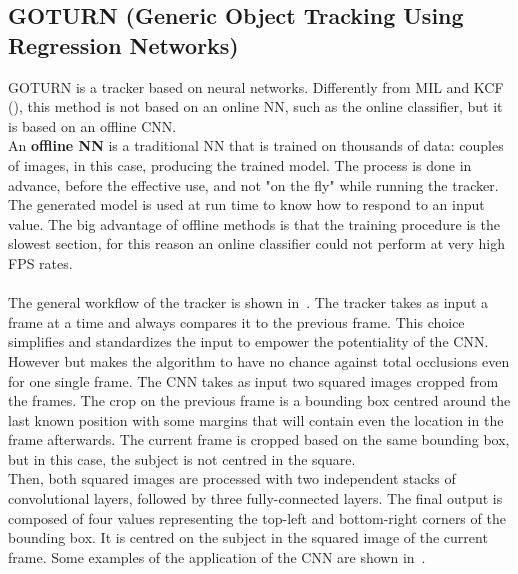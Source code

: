 \subsection{GOTURN (Generic Object Tracking Using Regression Networks)} \label{sec:goturn}
GOTURN\cite{goturn} is a tracker based on neural networks. Differently from MIL and KCF (), this method is not based on an online NN, such as the online classifier, but it is based on an offline CNN.\\
An \textbf{offline NN} is a traditional NN that is trained on thousands of data: couples of images, in this case, producing the trained model. The process is done in advance, before the effective use, and not "on the fly" while running the tracker. The generated model is used at run time to know how to respond to an input value. The big advantage of offline methods is that the training procedure is the slowest section, for this reason an online classifier could not perform at very high FPS rates.\\
\\
The general workflow of the tracker is shown in~. The tracker takes as input a frame at a time and always compares it to the previous frame. This choice simplifies and standardizes the input to empower the potentiality of the CNN. However but makes the algorithm to have no chance against total occlusions even for one single frame. The CNN takes as input two squared images cropped from the frames. The crop on the previous frame is a bounding box centred around the last known position with some margins that will contain even the location in the frame afterwards. The current frame is cropped based on the same bounding box, but in this case, the subject is not centred in the square.\\
Then, both squared images are processed with two independent stacks of convolutional layers, followed by three fully-connected layers. The final output is composed of four values representing the top-left and bottom-right corners of the bounding box. It is centred on the subject in the squared image of the current frame. Some examples of the application of the CNN are shown in~.

